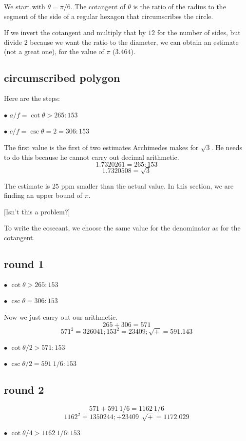 \documentclass[11pt, oneside]{article}
\begin{document}
We start with $\theta = \pi/6$.  The cotangent of $\theta$ is the ratio of the radius to the segment of the side of a regular hexagon that circumscribes the circle.  

If we invert the cotangent and multiply that by $12$ for the number of sides, but divide $2$ because we want the ratio to the diameter, we can obtain an estimate (not a great one), for the value of $\pi$ ($3.464$).

\subsection*{circumscribed polygon}

Here are the steps:

$\bullet$  $a/f = \cot \theta > 265:153$

$\bullet$  $c/f = \csc \theta = 2 = 306:153$

The first value is the first of two estimates Archimedes makes for $\sqrt{3}$.  He needs to do this because he cannot carry out decimal arithmetic.
\[ 1.7320261 = 265:153 \]
\[ 1.7320508 = \sqrt{3} \]

The estimate is 25 ppm smaller than the actual value.  In this section, we are finding an upper bound of $\pi$.

[Isn't this a problem?]

To write the cosecant, we choose the same value for the denominator as for the cotangent.

\subsection*{round 1}

$\bullet$  $\cot \theta > 265:153$

$\bullet$  $\csc \theta =  306:153$

Now we just carry out our arithmetic. 
\[ 265 + 306 = 571 \]
\[ 571^2 = 326041;  153^2 = 23409;  \sqrt{+} = 591.143 \]

$\bullet$  $\cot \theta/2 > 571:153$

$\bullet$  $\csc \theta/2 =591 \ 1/6:153$

\subsection*{round 2}
\[ 571 + 591 \ 1/6 = 1162 \ 1/6 \]
\[ 1162^2 = 1350244;  + 23409 \ \ \sqrt{+} = 1172.029 \]

$\bullet$  $\cot \theta/4 > 1162 \ 1/6:153$ 
\end{document}
